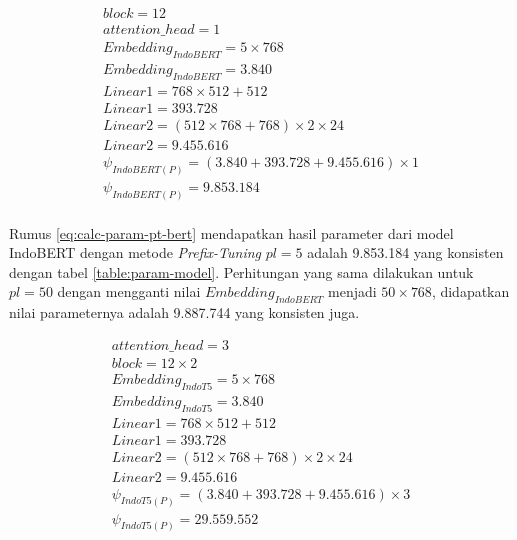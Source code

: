 \begin{equation}
    \begin{aligned}
        block = 12 \\
        attention\_head = 1 \\
        Embedding_{IndoBERT} = 5 \times 768 \\
        Embedding_{IndoBERT} = 3.840 \\
        Linear1 = 768 \times 512 + 512 \\
        Linear1 = 393.728 \\
        Linear2 = (512 \times 768 + 768) \times 2 \times 24 \\
        Linear2 = 9.455.616 \\
        \psi_{IndoBERT(P)} = (3.840 + 393.728 + 9.455.616) \times 1 \\
        \psi_{IndoBERT(P)} = 9.853.184 \\
    \end{aligned}
    \label{eq:calc-param-pt-bert}
\end{equation}

Rumus \ref{eq:calc-param-pt-bert} mendapatkan hasil parameter dari model IndoBERT dengan metode \textit{Prefix-Tuning} $pl=5$ adalah 9.853.184 yang konsisten dengan tabel \ref{table:param-model}. Perhitungan yang sama dilakukan untuk $pl=50$ dengan mengganti nilai $Embedding_{IndoBERT}$ menjadi $50 \times 768$, didapatkan nilai parameternya adalah 9.887.744 yang konsisten juga.

\begin{equation}
    \begin{aligned}
        attention\_head = 3 \\
        block = 12 \times 2 \\
        Embedding_{IndoT5} = 5 \times 768 \\
        Embedding_{IndoT5} = 3.840 \\
        Linear1 = 768 \times 512 + 512 \\
        Linear1 = 393.728 \\
        Linear2 = (512 \times 768 + 768) \times 2 \times 24 \\
        Linear2 = 9.455.616 \\
        \psi_{IndoT5(P)} = (3.840 + 393.728 + 9.455.616) \times 3 \\
        \psi_{IndoT5(P)} = 29.559.552 \\
    \end{aligned}
    \label{eq:calc-param-pt-t5}
\end{equation}

